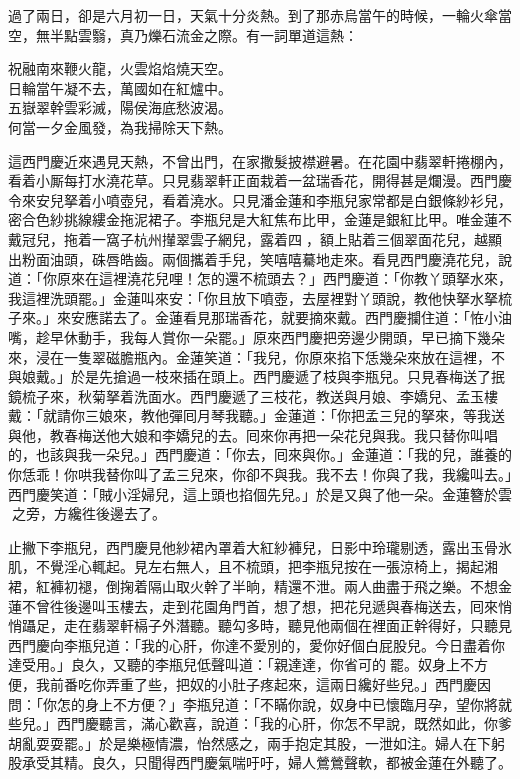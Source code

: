 過了兩日，卻是六月初一日，天氣十分炎熱。到了那赤烏當午的時候，一輪火傘當空，無半點雲翳，真乃爍石流金之際。有一詞單道這熱：

\begin{myquote}
祝融南來鞭火龍，火雲焰焰燒天空。\\日輪當午凝不去，萬國如在紅爐中。\\五嶽翠幹雲彩滅，陽侯海底愁波渴。\\何當一夕金風發，為我掃除天下熱。
\end{myquote}

這西門慶近來遇見天熱，不曾出門，在家撒髮披襟避暑。{}在花園中翡翠軒捲棚內，看着小厮每打水澆花草。只見翡翠軒正面栽着一盆瑞香花，開得甚是爛漫。西門慶令來安兒拏着小噴壺兒，看着澆水。只見潘金蓮和李瓶兒家常都是白銀條紗衫兒，密合色紗挑線縷金拖泥裙子。李瓶兒是大紅焦布比甲，金蓮是銀紅比甲。唯金蓮不戴冠兒，拖着一窩子杭州攆翠雲子網兒，露着四𩬆，額上貼着三個翠面花兒，越顯出粉面油頭，硃唇皓齒。兩個攜着手兒，笑嘻嘻驀地走來。看見西門慶澆花兒，說道：「你原來在這裡澆花兒哩！怎的還不梳頭去？」西門慶道：「你教丫頭拏水來，我這裡洗頭罷。」金蓮叫來安：「你且放下噴壺，去屋裡對丫頭說，教他快拏水拏梳子來。」來安應諾去了。金蓮看見那瑞香花，就要摘來戴。{}西門慶攔住道：「恠小油嘴，趁早休動手，我每人賞你一朵罷。」原來西門慶把旁邊少開頭，早已摘下幾朵來，浸在一隻翠磁膽瓶內。金蓮笑道：「我兒，你原來掐下恁幾朵來放在這裡，不與娘戴。」於是先搶過一枝來插在頭上。西門慶遞了枝與李瓶兒。只見春梅送了抿鏡梳子來，秋菊拏着洗面水。西門慶遞了三枝花，教送與月娘、李嬌兒、孟玉樓戴：「就請你三娘來，教他彈囘月琴我聽。」金蓮道：「你把孟三兒的拏來，等我送與他，教春梅送他大娘和李嬌兒的去。囘來你再把一朵花兒與我。我只替你叫唱的，也該與我一朵兒。」西門慶道：「你去，囘來與你。」金蓮道：「我的兒，誰養的你恁乖！你哄我替你叫了孟三兒來，你卻不與我。我不去！你與了我，我纔叫去。」西門慶笑道：「賊小淫婦兒，這上頭也掐個先兒。」於是又與了他一朵。金蓮簪於雲𩬆之旁，{}方纔徃後邊去了。

止撇下李瓶兒，西門慶見他紗裙內罩着大紅紗褲兒，日影中玲瓏剔透，露出玉骨氷肌，不覺淫心輒起。見左右無人，且不梳頭，把李瓶兒按在一張涼椅上，揭起湘裙，紅褲初褪，倒掬着隔山取火幹了半晌，精還不泄。兩人曲盡于飛之樂。不想金蓮不曾徃後邊叫玉樓去，走到花園角門首，想了想，把花兒遞與春梅送去，囘來悄悄躡足，走在翡翠軒槅子外潛聽。{}聽勾多時，聽見他兩個在裡面正幹得好，只聽見西門慶向李瓶兒道：「我的心肝，你達不愛別的，愛你好個白屁股兒。今日盡着你達受用。」良久，又聽的李瓶兒低聲叫道：「親達達，你省可的𢵞罷。奴身上不方便，我前番吃你弄重了些，把奴的小肚子疼起來，這兩日纔好些兒。」西門慶因問：「你怎的身上不方便？」李瓶兒道：「不瞞你說，奴身中已懷臨月孕，{}望你將就些兒。」西門慶聽言，滿心歡喜，說道：「我的心肝，你怎不早說，既然如此，你爹胡亂耍耍罷。」於是樂極情濃，怡然感之，兩手抱定其股，一泄如注。婦人在下躬股承受其精。良久，只聞得西門慶氣喘吁吁，婦人鶯鶯聲軟，都被金蓮在外聽了。

